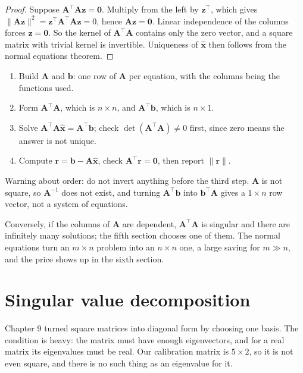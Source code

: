 \begin{proof}
Suppose $\mathbf{A}^{\top}\mathbf{A}\mathbf{z}=\mathbf{0}$. Multiply from the left by
$\mathbf{z}^{\top}$, which gives $\|\mathbf{A}\mathbf{z}\|^{2}
=\mathbf{z}^{\top}\mathbf{A}^{\top}\mathbf{A}\mathbf{z}=0$, hence
$\mathbf{A}\mathbf{z}=\mathbf{0}$. Linear independence of the columns forces $\mathbf{z}=\mathbf{0}$.
So the kernel of $\mathbf{A}^{\top}\mathbf{A}$ contains only the zero vector, and a square
matrix with trivial kernel is invertible. Uniqueness of $\hat{\mathbf{x}}$ then follows from
the normal equations theorem.
\end{proof}

\begin{resep}
\begin{enumerate}
  \item Build $\mathbf{A}$ and $\mathbf{b}$: one row of $\mathbf{A}$ per equation, with the columns being the functions used.
  \item Form $\mathbf{A}^{\top}\mathbf{A}$, which is $n\times n$, and $\mathbf{A}^{\top}\mathbf{b}$, which is $n\times1$.
  \item Solve $\mathbf{A}^{\top}\mathbf{A}\hat{\mathbf{x}}=\mathbf{A}^{\top}\mathbf{b}$; check $\det(\mathbf{A}^{\top}\mathbf{A})\ne0$ first, since zero means the answer is not unique.
  \item Compute $\mathbf{r}=\mathbf{b}-\mathbf{A}\hat{\mathbf{x}}$, check $\mathbf{A}^{\top}\mathbf{r}=\mathbf{0}$, then report $\|\mathbf{r}\|$.
\end{enumerate}
Warning about order: do not invert anything before the third step. $\mathbf{A}$ is not square, so $\mathbf{A}^{-1}$ does not exist, and turning $\mathbf{A}^{\top}\mathbf{b}$ into $\mathbf{b}^{\top}\mathbf{A}$ gives a $1\times n$ row vector, not a system of equations.
\end{resep}

Conversely, if the columns of $\mathbf{A}$ are dependent, $\mathbf{A}^{\top}\mathbf{A}$ is singular
and there are infinitely many solutions; the fifth section chooses one of them. The normal
equations turn an $m\times n$ problem into an $n\times n$ one, a large saving for
$m\gg n$, and the price shows up in the sixth section.

\section{Singular value decomposition}

Chapter 9 turned square matrices into diagonal form by choosing one basis.
The condition is heavy: the matrix must have enough eigenvectors, and for a real matrix its
eigenvalues must be real. Our calibration matrix is $5\times2$, so it is not even
square, and there is no such thing as an eigenvalue for it.

